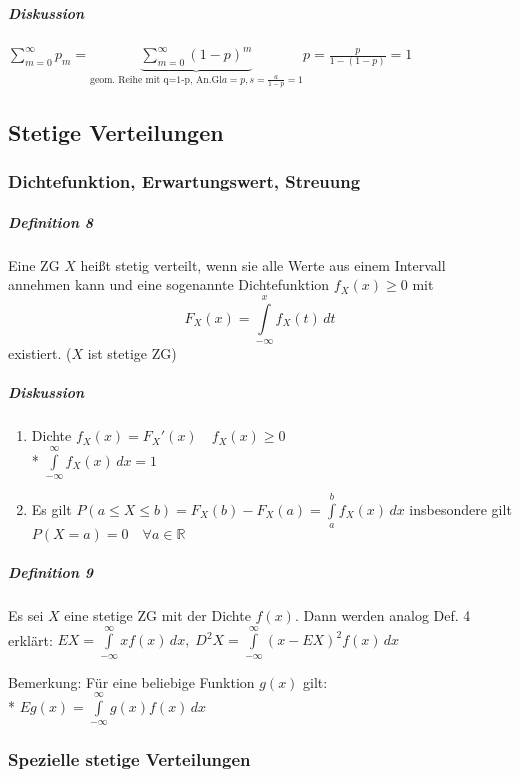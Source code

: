 \documentclass[a4paper]{scrartcl}
\begin{document}
\begin{enumerate}
\subparagraph{Diskussion} $\sum\limits_{m=0}^{\infty} p_m = \underbrace{\sum\limits_{m=0}^\infty (1-p)^m}_{\text{geom. Reihe mit q=1-p, An.Gl} a=p, s= \frac{a}{1-p} = 1} p = \frac{p}{1-(1-p)} = 1 $
\end{enumerate}
\subsection{Stetige Verteilungen}
\subsubsection{Dichtefunktion, Erwartungswert, Streuung}
\subparagraph{Definition 8} Eine ZG $X$ heißt stetig verteilt, wenn sie alle Werte aus einem Intervall annehmen kann und eine sogenannte Dichtefunktion $f_X (x) \geq 0$ mit 
\[ F_X (x) = \int\limits_{-\infty}^x f_X (t) \, dt\] existiert. ($X$ ist stetige ZG)

\subparagraph{Diskussion}
\begin{enumerate}
\item Dichte $f_X (x) = F_X' (x) \quad f_X (x) \geq 0$\\*
$\int\limits_{-\infty}^\infty f_X (x) \, dx = 1$
\item Es gilt $P(a \leq X \leq b ) = F_X(b) - F_X (a) = \int\limits_a^b f_X(x) \, dx$ insbesondere gilt $P(X=a) = 0 \quad \forall a \in \mathbb{R}$
\end{enumerate}

\subparagraph{Definition 9} Es sei $X$ eine stetige ZG mit der Dichte $f(x)$. Dann werden analog Def. 4 erklärt:
$EX = \int\limits_{-\infty}^\infty x f(x)\, dx, \; D^2X = \int\limits_{-\infty}^\infty (x-EX)^2 f(x) \, dx$

Bemerkung: Für eine beliebige Funktion $g(x)$ gilt:\\*
$E g (x)= \int\limits_{-\infty}^\infty g(x) f(x) \, dx$



\subsubsection{Spezielle stetige Verteilungen}
\end{document}
